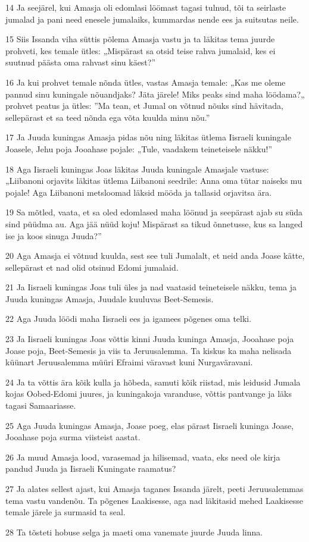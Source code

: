 \par 14 Ja seejärel, kui Amasja oli edomlasi löömast tagasi tulnud, tõi ta seirlaste jumalad ja pani need enesele jumalaiks, kummardas nende ees ja suitsutas neile.
\par 15 Siis Issanda viha süttis põlema Amasja vastu ja ta läkitas tema juurde prohveti, kes temale ütles: „Mispärast sa otsid teise rahva jumalaid, kes ei suutnud päästa oma rahvast sinu käest?”
\par 16 Ja kui prohvet temale nõnda ütles, vastas Amasja temale: „Kas me oleme pannud sinu kuningale nõuandjaks? Jäta järele! Miks peaks sind maha löödama?„ prohvet peatus ja ütles: ”Ma tean, et Jumal on võtnud nõuks sind hävitada, sellepärast et sa teed nõnda ega võta kuulda minu nõu.”
\par 17 Ja Juuda kuningas Amasja pidas nõu ning läkitas ütlema Iisraeli kuningale Joasele, Jehu poja Jooahase pojale: „Tule, vaadakem teineteisele näkku!”
\par 18 Aga Iisraeli kuningas Joas läkitas Juuda kuningale Amasjale vastuse: „Liibanoni orjavits läkitas ütlema Liibanoni seedrile: Anna oma tütar naiseks mu pojale! Aga Liibanoni metsloomad läksid mööda ja tallasid orjavitsa ära.
\par 19 Sa mõtled, vaata, et sa oled edomlased maha löönud ja seepärast ajab su süda sind püüdma au. Aga jää nüüd koju! Mispärast sa tikud õnnetusse, kus sa langed ise ja koos sinuga Juuda?”
\par 20 Aga Amasja ei võtnud kuulda, sest see tuli Jumalalt, et neid anda Joase kätte, sellepärast et nad olid otsinud Edomi jumalaid.
\par 21 Ja Iisraeli kuningas Joas tuli üles ja nad vaatasid teineteisele näkku, tema ja Juuda kuningas Amasja, Juudale kuuluvas Beet-Semesis.
\par 22 Aga Juuda löödi maha Iisraeli ees ja igamees põgenes oma telki.
\par 23 Ja Iisraeli kuningas Joas võttis kinni Juuda kuninga Amasja, Jooahase poja Joase poja, Beet-Semesis ja viis ta Jeruusalemma. Ta kiskus ka maha nelisada küünart Jeruusalemma müüri Efraimi väravast kuni Nurgaväravani.
\par 24 Ja ta võttis ära kõik kulla ja hõbeda, samuti kõik riistad, mis leidusid Jumala kojas Oobed-Edomi juures, ja kuningakoja varanduse, võttis pantvange ja läks tagasi Samaariasse.
\par 25 Aga Juuda kuningas Amasja, Joase poeg, elas pärast Iisraeli kuninga Joase, Jooahase poja surma viisteist aastat.
\par 26 Ja muud Amasja lood, varasemad ja hilisemad, vaata, eks need ole kirja pandud Juuda ja Iisraeli Kuningate raamatus?
\par 27 Ja alates sellest ajast, kui Amasja taganes Issanda järelt, peeti Jeruusalemmas tema vastu vandenõu. Ta põgenes Laakisesse, aga nad läkitasid mehed Laakisesse temale järele ja surmasid ta seal.
\par 28 Ta tõsteti hobuse selga ja maeti oma vanemate juurde Juuda linna.

